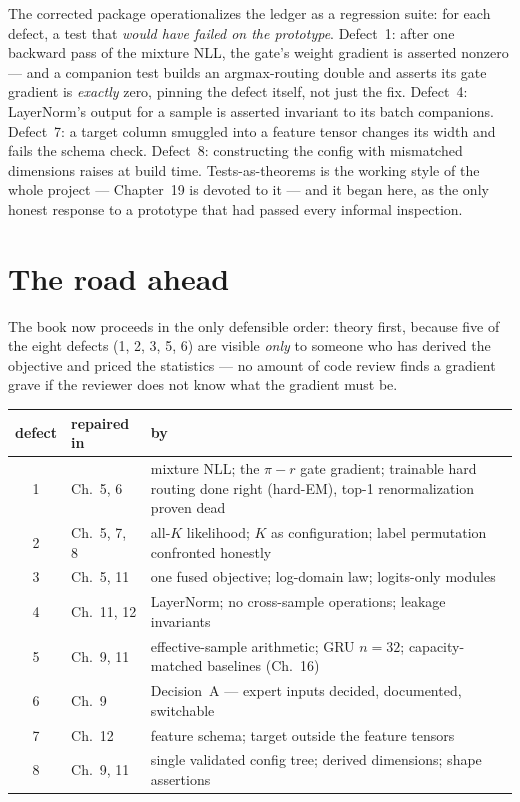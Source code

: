 \begin{engineering}
The corrected package operationalizes the ledger as a regression suite:
for each defect, a test that \emph{would have failed on the prototype}.
Defect~1: after one backward pass of the mixture NLL, the gate's weight
gradient is asserted nonzero --- and a companion test builds an
argmax-routing double and asserts its gate gradient is \emph{exactly} zero,
pinning the defect itself, not just the fix. Defect~4: LayerNorm's output
for a sample is asserted invariant to its batch companions. Defect~7: a
target column smuggled into a feature tensor changes its width and fails
the schema check. Defect~8: constructing the config with mismatched
dimensions raises at build time. Tests-as-theorems is the working style of
the whole project --- Chapter~19 is devoted to it --- and it began here, as
the only honest response to a prototype that had passed every informal
inspection.
\end{engineering}

\section{The road ahead}\label{sec:roadmap}

The book now proceeds in the only defensible order: theory first, because
five of the eight defects (1, 2, 3, 5, 6) are visible \emph{only} to someone
who has derived the objective and priced the statistics --- no amount of
code review finds a gradient grave if the reviewer does not know what the
gradient must be.

\begin{center}
\small
\begin{tabular}{@{}clp{}@{}}
\toprule
defect & repaired in & by \\
\midrule
1 & Ch.~5, 6 & mixture NLL; the $\pi{-}r$ gate gradient; trainable hard
              routing done right (hard-EM), top-1 renormalization proven
              dead \\
2 & Ch.~5, 7, 8 & all-$K$ likelihood; $K$ as configuration; label
              permutation confronted honestly \\
3 & Ch.~5, 11 & one fused objective; log-domain law; logits-only modules \\
4 & Ch.~11, 12 & LayerNorm; no cross-sample operations; leakage invariants \\
5 & Ch.~9, 11 & effective-sample arithmetic; GRU $n{=}32$; capacity-matched
              baselines (Ch.~16) \\
6 & Ch.~9 & Decision~A --- expert inputs decided, documented, switchable \\
7 & Ch.~12 & feature schema; target outside the feature tensors \\
8 & Ch.~9, 11 & single validated config tree; derived dimensions; shape
              assertions \\
\bottomrule
\end{tabular}
\end{center}


